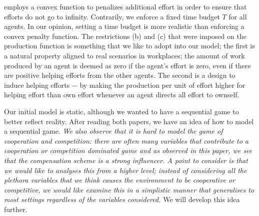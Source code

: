 \documentclass[a4paper,10pt]{article}
\theoremstyle{definition}
\begin{document}
	\cite{Drago1991} employs a convex function to penalizes additional effort in order to ensure that efforts do not go to infinity. Contrarily, we enforce a fixed time budget $T$ for all agents. In our opinion, setting a time budget is more realistic than enforcing a convex penalty function. The restrictions (b) and (c) that were imposed on the production function is something that we like to adopt into our model; the first is a natural property aligned to real scenarios in workplaces; the amount of work produced by an agent is deemed as zero if the agent's effort is zero, even if there are positive helping efforts from the other agents. The second is a design to induce helping efforts $-$ by making the production per unit of effort higher for helping effort than own effort whenever an agent directs all effort to ownself. 
	
		
	Our initial model is static, although we wanted to have a sequential game to better reflect reality. After reading both papers, we have an idea of how to model a sequential game. \emph{We also observe that it is hard to model the game of cooperation and competition: there are often many variables that contribute to a cooperation or competition dominated game and as observed in this paper, we see that the compensation scheme is a strong influencer. A point to consider is that we would like to analyses this from a higher level; instead of considering all the plethora variables that we think causes the environment to be cooperative or competitive, we would like examine this in a simplistic manner that generalises to most settings regardless of the variables considered.} We will develop this idea further.




 



%
%
%
%
\end{document}

